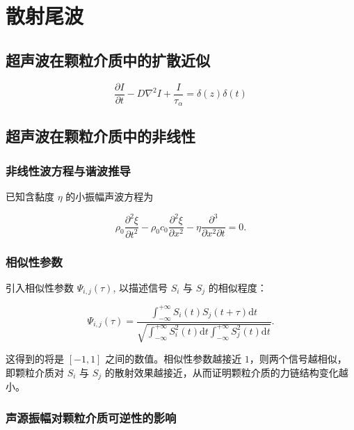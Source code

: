 
\chapter{散射尾波}

\section{超声波在颗粒介质中的扩散近似}

\begin{equation}
  \frac{\partial I}{\partial t} - D\nabla^{2}I + \frac{I}{\tau_{\alpha}} = \delta(z)\delta(t)
\end{equation}


\section{超声波在颗粒介质中的非线性}

\subsection{非线性波方程与谐波推导}

已知含黏度 $\eta$ 的小振幅声波方程为

\begin{equation}
  \rho_{0}\frac{\partial^{2}\xi}{\partial t^{2}} - \rho_{0}c_{0}\frac{\partial^{2}\xi}{\partial x^{2}} - \eta\frac{\partial^{3}}{\partial x^{2}\partial t} = 0.
\end{equation}



\subsection{相似性参数}

引入相似性参数 $\Psi_{i,j}(\tau)$, 以描述信号 $S_{i}$ 与 $S_{j}$ 的相似程度：

\begin{equation}
  \Psi_{i,j}(\tau) = \frac{\int_{-\infty}^{+\infty}S_{i}(t)S_{j}(t+\tau)\mathrm{d}t}{\sqrt{\int_{-\infty}^{+\infty}S_{i}^{2}(t)\mathrm{d}t\int_{-\infty}^{+\infty}S_{j}^{2}(t)\mathrm{d}t}}.
\end{equation}

这得到的将是 $[-1,1]$ 之间的数值。相似性参数越接近 $1$，则两个信号越相似，即颗粒介质对 $S_{i}$ 与 $S_{j}$ 的散射效果越接近，从而证明颗粒介质的力链结构变化越小。

\subsection{声源振幅对颗粒介质可逆性的影响}